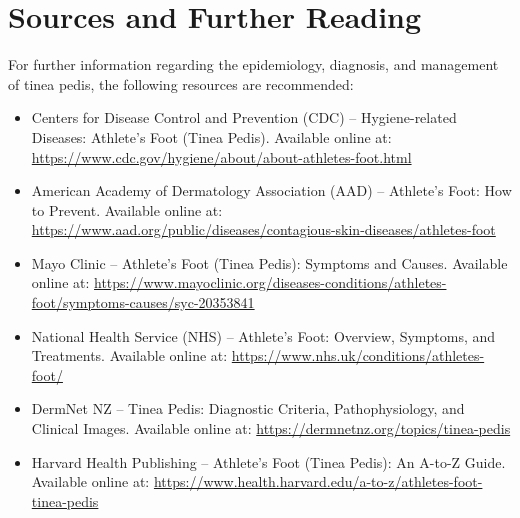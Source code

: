 \section*{Sources and Further Reading}
For further information regarding the epidemiology, diagnosis, and management of tinea pedis, the following resources are recommended:
\begin{itemize}
    \item Centers for Disease Control and Prevention (CDC) -- Hygiene-related Diseases: Athlete's Foot (Tinea Pedis). Available online at: \url{https://www.cdc.gov/hygiene/about/about-athletes-foot.html}
    \item American Academy of Dermatology Association (AAD) -- Athlete's Foot: How to Prevent. Available online at: \url{https://www.aad.org/public/diseases/contagious-skin-diseases/athletes-foot}
    \item Mayo Clinic -- Athlete's Foot (Tinea Pedis): Symptoms and Causes. Available online at: \url{https://www.mayoclinic.org/diseases-conditions/athletes-foot/symptoms-causes/syc-20353841}
    \item National Health Service (NHS) -- Athlete's Foot: Overview, Symptoms, and Treatments. Available online at: \url{https://www.nhs.uk/conditions/athletes-foot/}
    \item DermNet NZ -- Tinea Pedis: Diagnostic Criteria, Pathophysiology, and Clinical Images. Available online at: \url{https://dermnetnz.org/topics/tinea-pedis}
    \item Harvard Health Publishing -- Athlete's Foot (Tinea Pedis): An A-to-Z Guide. Available online at: \url{https://www.health.harvard.edu/a-to-z/athletes-foot-tinea-pedis}
\end{itemize}